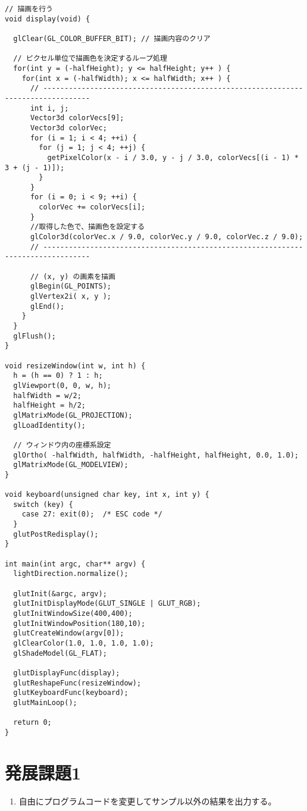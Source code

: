 \documentclass{scrartcl}
\begin{document}
\begin{verbatim}
// 描画を行う
void display(void) {

  glClear(GL_COLOR_BUFFER_BIT); // 描画内容のクリア

  // ピクセル単位で描画色を決定するループ処理
  for(int y = (-halfHeight); y <= halfHeight; y++ ) {
    for(int x = (-halfWidth); x <= halfWidth; x++ ) {
      // ---------------------------------------------------------------------------------
      int i, j;
      Vector3d colorVecs[9];
      Vector3d colorVec;
      for (i = 1; i < 4; ++i) {
        for (j = 1; j < 4; ++j) {
          getPixelColor(x - i / 3.0, y - j / 3.0, colorVecs[(i - 1) * 3 + (j - 1)]);
        }
      }
      for (i = 0; i < 9; ++i) {
        colorVec += colorVecs[i];
      }
      //取得した色で、描画色を設定する
      glColor3d(colorVec.x / 9.0, colorVec.y / 9.0, colorVec.z / 9.0);
      // ---------------------------------------------------------------------------------

      // (x, y) の画素を描画
      glBegin(GL_POINTS);
      glVertex2i( x, y );
      glEnd();
    }
  }
  glFlush();
}

void resizeWindow(int w, int h) {
  h = (h == 0) ? 1 : h;
  glViewport(0, 0, w, h);
  halfWidth = w/2;
  halfHeight = h/2;
  glMatrixMode(GL_PROJECTION);
  glLoadIdentity();

  // ウィンドウ内の座標系設定
  glOrtho( -halfWidth, halfWidth, -halfHeight, halfHeight, 0.0, 1.0);
  glMatrixMode(GL_MODELVIEW);
}

void keyboard(unsigned char key, int x, int y) {
  switch (key) {
    case 27: exit(0);  /* ESC code */
  }
  glutPostRedisplay();
}

int main(int argc, char** argv) {
  lightDirection.normalize();

  glutInit(&argc, argv);
  glutInitDisplayMode(GLUT_SINGLE | GLUT_RGB);
  glutInitWindowSize(400,400);
  glutInitWindowPosition(180,10);
  glutCreateWindow(argv[0]);
  glClearColor(1.0, 1.0, 1.0, 1.0);
  glShadeModel(GL_FLAT);

  glutDisplayFunc(display);
  glutReshapeFunc(resizeWindow);
  glutKeyboardFunc(keyboard);
  glutMainLoop();

  return 0;
}
\end{verbatim}

\section{発展課題1}
\label{sec:org58e3258}
\begin{enumerate}
\item 自由にプログラムコードを変更してサンプル以外の結果を出力する。\\
\end{enumerate}
\end{document}
